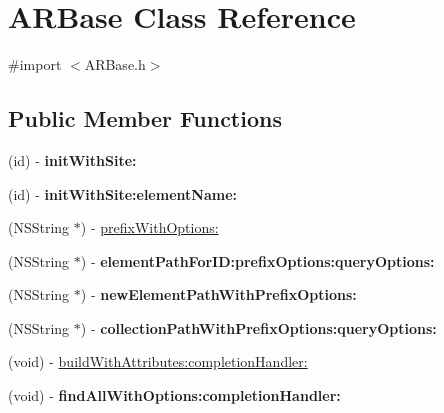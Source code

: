\hypertarget{interface_a_r_base}{
\section{\-A\-R\-Base \-Class \-Reference}
\label{interface_a_r_base}
}


{\ttfamily \#import $<$\-A\-R\-Base.\-h$>$}

\subsection*{\-Public \-Member \-Functions}
\begin{DoxyCompactItemize}
\item 
\hypertarget{interface_a_r_base_a73d373f564efe4638e3e32ce597e4f9a}{
(id) -\/ {\bfseries init\-With\-Site\-:}}
\label{interface_a_r_base_a73d373f564efe4638e3e32ce597e4f9a}

\item 
\hypertarget{interface_a_r_base_a4b502f26de7219184c4c2c5c97a6643a}{
(id) -\/ {\bfseries init\-With\-Site\-:element\-Name\-:}}
\label{interface_a_r_base_a4b502f26de7219184c4c2c5c97a6643a}

\item 
(\-N\-S\-String $\ast$) -\/ \hyperlink{interface_a_r_base_a927a21ede543031d0bdbbc9c4c334a95}{prefix\-With\-Options\-:}
\item 
\hypertarget{interface_a_r_base_a979b630979926df19866ec1e081a6f2f}{
(\-N\-S\-String $\ast$) -\/ {\bfseries element\-Path\-For\-I\-D\-:prefix\-Options\-:query\-Options\-:}}
\label{interface_a_r_base_a979b630979926df19866ec1e081a6f2f}

\item 
\hypertarget{interface_a_r_base_a9bf809bd99b8b142b87c66f8d56224a3}{
(\-N\-S\-String $\ast$) -\/ {\bfseries new\-Element\-Path\-With\-Prefix\-Options\-:}}
\label{interface_a_r_base_a9bf809bd99b8b142b87c66f8d56224a3}

\item 
\hypertarget{interface_a_r_base_a1ee9032aa114bb273e86220be27a9c40}{
(\-N\-S\-String $\ast$) -\/ {\bfseries collection\-Path\-With\-Prefix\-Options\-:query\-Options\-:}}
\label{interface_a_r_base_a1ee9032aa114bb273e86220be27a9c40}

\item 
(void) -\/ \hyperlink{interface_a_r_base_a8bc6aca5de5b209bf470d6daf0850443}{build\-With\-Attributes\-:completion\-Handler\-:}
\item 
\hypertarget{interface_a_r_base_a0e575ff1338cfd465deb9173a303a3b2}{
(void) -\/ {\bfseries find\-All\-With\-Options\-:completion\-Handler\-:}}
\label{interface_a_r_base_a0e575ff1338cfd465deb9173a303a3b2}


\end{DoxyCompactItemize}
